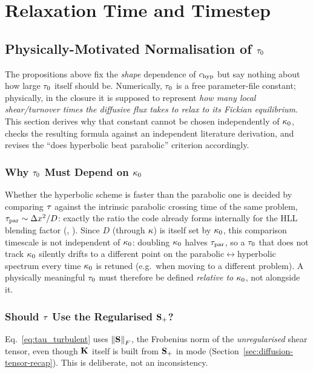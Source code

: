 \section{Relaxation Time and Timestep}

\subsection{Physically-Motivated Normalisation of $\tau_0$}
\label{sec:tau0-physical}

The propositions above fix the \emph{shape} dependence of $c_{\rm hyp}$ but say
nothing about how large $\tau_0$ itself should be. Numerically,
$\tau_0$ is a free parameter-file constant; physically, in the
 closure it is supposed to represent \emph{how many
local shear/turnover times the diffusive flux takes to relax to its
Fickian equilibrium}. This section derives why that constant cannot be
chosen independently of $\kappa_{0}$, checks the resulting formula against an
independent literature derivation, and revises the ``does hyperbolic beat
parabolic'' criterion accordingly.

\subsubsection{Why $\tau_0$ Must Depend on $\kappa_{0}$}
\label{sec:tau0-motivation}
Whether the hyperbolic scheme is faster than the parabolic one is decided
by comparing $\tau$ against the intrinsic parabolic crossing time of
the same problem, $\tau_{\rm par}\sim\Delta x^2/D$: exactly the ratio the
code already forms internally for the HLL blending factor
(,
). Since $D$ (through $\kappa$) is itself
set by $\kappa_{0}$, this comparison timescale is not independent of
$\kappa_{0}$: doubling $\kappa_{0}$ halves $\tau_{\rm par}$, so a
$\tau_0$ that does not track $\kappa_{0}$ silently drifts to a different
point on the parabolic$\leftrightarrow$hyperbolic spectrum every time
$\kappa_{0}$ is retuned (e.g.\ when moving to a different problem). A physically meaningful
$\tau_0$ must therefore be defined \emph{relative to} $\kappa_{0}$, not
alongside it.

\subsubsection{Should $\tau$ Use the Regularised $\mathbf{S}_{+}$?}
\label{sec:tau-no-regularisation}
Eq.~\eqref{eq:tau_turbulent} uses $\norm{\mathbf{S}}_F$, the Frobenius norm of
the \emph{unregularised} shear tensor, even though $\mathbf{K}$ itself is built
from $\mathbf{S}_{+}$ in  mode
(Section~\ref{sec:diffusion-tensor-recap}). This is deliberate, not an
inconsistency.

